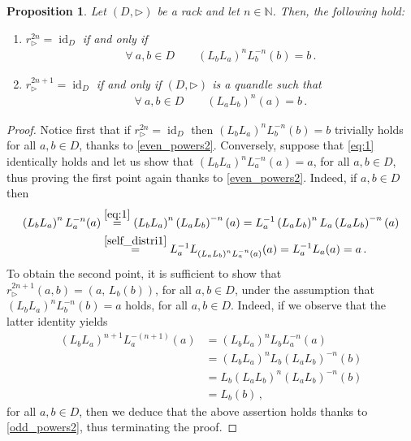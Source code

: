 \documentclass[preprint,1p]{elsarticle}
\numberwithin{equation}{section}
\newtheorem{prop}[theor]{Proposition}
\theoremstyle{definition}               %
\newcommand{\overeq}[1]{\overset{#1}{=}}
\newcommand{\tr}{\triangleright}
\DeclareMathOperator{\id}{id}
\begin{document}
\smallskip

\begin{prop}\label{prop-even-odd}
    Let $(D,\tr)$ be a rack and let $n \in \mathbb{N}$.
    Then, the following hold:
    \begin{enumerate}
        \item[\textnormal{1)}] $r_\tr^{2n} = \id_D$ if and only if 
        \begin{align}\label{eq:1} 
        \forall\ a,b\in D\qquad (L_bL_a)^nL_b^{-n}(b) = b \,.
         \end{align}
         \item[\textnormal{2)}] $r_\tr^{2n+1} = \id_D$ if and only if $(D,\tr)$ is a quandle  such that
    \begin{align}\label{eq:2}        
    \forall\ a,b\in D\qquad (L_aL_b)^n(a) = b \,.
\end{align}
    \end{enumerate}
\end{prop}
\begin{proof}
    Notice first that if $r_\tr^{2n} = \id_D$ then $\left(L_bL_a\right)^nL_b^{-n}(b) = b$ trivially holds for all $a,b \in D$, thanks to \eqref{even_powers2}.
    Conversely, suppose that \eqref{eq:1} identically holds and let us show that $(L_bL_a)^nL_a^{-n}(a) = a$, for all $a,b \in D$, thus proving the first point again thanks to \eqref{even_powers2}.
    Indeed, if $a,b \in D$ then
    \begin{align*}
        \left(L_bL_a\right)^nL_a^{-n}(a) 
        &\overeq{\eqref{eq:1}}
        \left(L_bL_a\right)^n\left(L_aL_b\right)^{-n}(a)
        =
        L_a^{-1}\left(L_aL_b\right)^nL_a\left(L_aL_b\right)^{-n}(a)\\
        &\overeq{\eqref{self_distri1}}
        L_a^{-1}L_{\left(L_aL_b\right)^nL_a^{-n}(a)}(a) = L_a^{-1}L_a(a) = a \,.
    \end{align*}
    To obtain the second point, it is sufficient to show that $r_\tr^{2n+1}(a,b) = (a,\,L_b(b))$, for all $a,b\in D$, under the assumption that $(L_bL_a)^nL_b^{-n}(b) = a$ holds, for all $a,b\in D$. 
    Indeed, if we observe that {the latter identity yields}
        \begin{align*}
            (L_bL_a)^{n+1}L_a^{-(n+1)}(a) 
            &= (L_bL_a)^n L_bL_a^{-n}(a) \\
            &= {(L_bL_a)^n L_b (L_aL_b)^{-n}(b)} \\
            &= L_b (L_aL_b)^n(L_aL_b)^{-n}(b) \\
            &= L_b(b) \,,
        \end{align*}
    for all $a,b \in D$, then we deduce that the above assertion holds thanks to \eqref{odd_powers2}, thus terminating the proof. 
\end{proof}
\smallskip
\end{document}
